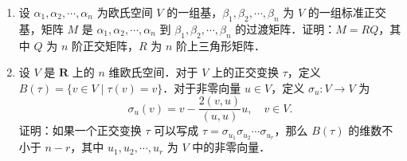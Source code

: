 \begin{enumerate}
  \item 设 $\alpha_1,\alpha_2,\cdots,\alpha_n$ 为欧氏空间 $V$ 的一组基，$\beta_1,\beta_2,\cdots,\beta_n$ 为 $V$ 的一组标准正交基，矩阵 $M$ 是 $\alpha_1,\alpha_2,\cdots,\alpha_n$ 到 $\beta_1,\beta_2,\cdots,\beta_n$ 的过渡矩阵．证明：$M=RQ$，其中 $Q$ 为 $n$ 阶正交矩阵，$R$ 为 $n$ 阶上三角形矩阵．

  \ansproof
  \item 设 $V$ 是 $\mathbf{R}$ 上的 $n$ 维欧氏空间．对于 $V$ 上的正交变换 $\tau$，定义 $B(\tau)=\{v\in V\mid \tau(v)=v\}$．对于非零向量 $u\in V$，定义 $\sigma_u\colon V\to V$ 为
  \[
  \sigma_u(v)=v-\frac{2(v,u)}{(u,u)}u,\quad v\in V.
  \]
  证明：如果一个正交变换 $\tau$ 可以写成 $\tau=\sigma_{u_1}\sigma_{u_2}\cdots\sigma_{u_r}$，那么 $B(\tau)$ 的维数不小于 $n-r$，其中 $u_1,u_2,\cdots,u_r$ 为 $V$ 中的非零向量．
  \ansproof
\end{enumerate}
